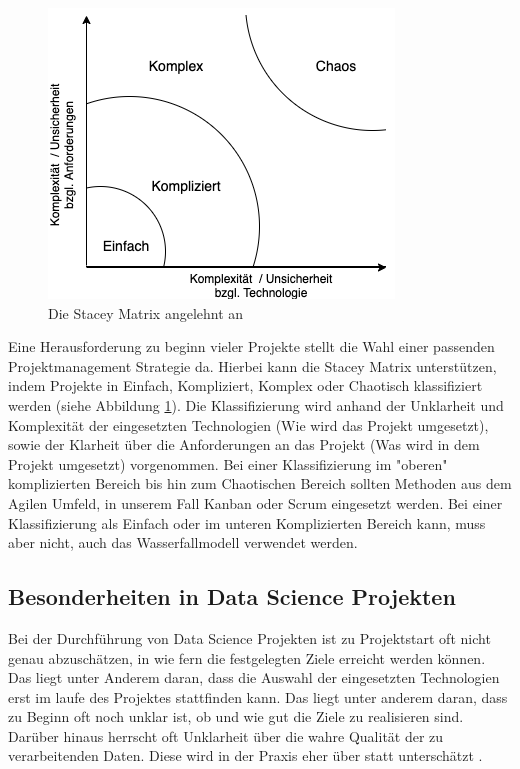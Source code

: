 \documentclass[twocolumn,10pt]{asme2ej}
\begin{document}
\begin{figure}
	\includegraphics[scale=0.65	]{stacey.png}
	\caption[center]{Die Stacey Matrix angelehnt an \cite{stacey_img}}
	\label{fig:stacey}
\end{figure}

Eine Herausforderung zu beginn vieler Projekte stellt die Wahl einer passenden Projektmanagement Strategie da. Hierbei kann die Stacey Matrix \cite{Stacey2011StrategicMA} unterstützen, indem Projekte in Einfach, Kompliziert, Komplex oder Chaotisch klassifiziert werden (siehe Abbildung \ref{fig:stacey}). Die Klassifizierung wird anhand der Unklarheit und Komplexität der eingesetzten Technologien (Wie wird das Projekt umgesetzt), sowie der Klarheit über die Anforderungen an das Projekt (Was wird in dem Projekt umgesetzt) vorgenommen. Bei einer Klassifizierung im "oberen" komplizierten Bereich bis hin zum Chaotischen Bereich sollten Methoden aus dem Agilen Umfeld, in unserem Fall Kanban oder Scrum eingesetzt werden. Bei einer Klassifizierung als Einfach oder im unteren Komplizierten Bereich kann, muss aber nicht, auch das Wasserfallmodell verwendet werden.

\subsection{Besonderheiten in Data Science Projekten}\label{sec:1}

Bei der Durchführung von Data Science Projekten ist zu Projektstart oft nicht genau abzuschätzen, in wie fern die festgelegten Ziele erreicht werden können. Das liegt unter Anderem daran, dass die Auswahl der eingesetzten Technologien erst im laufe des Projektes stattfinden kann. Das liegt unter anderem daran, dass zu Beginn oft noch unklar ist, ob und wie gut die Ziele zu realisieren sind. Darüber hinaus herrscht oft Unklarheit über die wahre Qualität der zu verarbeitenden Daten. Diese wird in der Praxis eher über statt unterschätzt \cite{agile_pm}.
\end{document}
